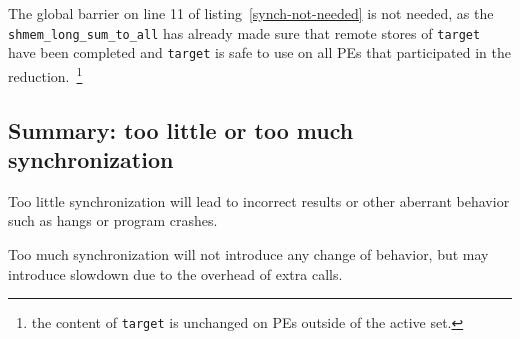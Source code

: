 The global barrier on line 11 of listing~\ref{synch-not-needed} is not
needed, as the \\ \texttt{shmem\_long\_sum\_to\_all} has already made
sure that remote stores of \texttt{target} have been completed and
\texttt{target} is safe to use on all PEs that participated in the
reduction.~\footnote{the content of \texttt{target} is unchanged on PEs
  outside of the active set.}

\subsection{Summary: too little or too much synchronization}

Too little synchronization will lead to incorrect results or other
aberrant behavior such as hangs or program crashes.

Too much synchronization will not introduce any change of behavior,
but may introduce slowdown due to the overhead of extra calls.
